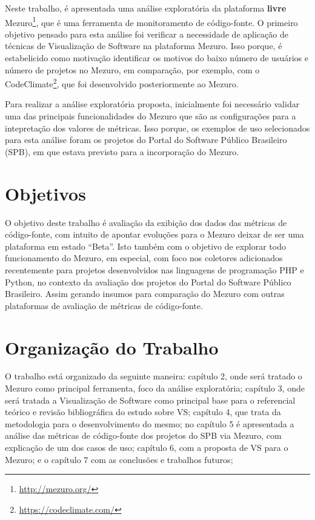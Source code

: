Neste trabalho, é apresentada uma análise exploratória da plataforma \textbf{livre}
Mezuro\footnote{\url{http://mezuro.org/}}, que é uma ferramenta de monitoramento
de código-fonte. O primeiro objetivo pensado para esta análise foi verificar a
necessidade de aplicação de técnicas de Visualização de Software na plataforma
Mezuro. Isso porque, é estabelicido como motivação identificar os motivos do
baixo número de usuários e número de projetos no Mezuro, em comparação, por
exemplo, com o CodeClimate\footnote{\url{https://codeclimate.com/}}, que foi
desenvolvido posteriormente ao Mezuro.

Para realizar a análise exploratória proposta, inicialmente foi necessário
validar uma das principais funcionalidades do Mezuro que são as configurações
para a intepretação dos valores de métricas. Isso porque, os exemplos de uso
selecionados para esta análise foram os projetos do Portal do Software
Público Brasileiro (SPB), em que estava previsto para a incorporação do Mezuro.

\section{Objetivos}

O objetivo deste trabalho é avaliação da exibição dos dados das métricas de
código-fonte, com intuito de apontar evoluções para o Mezuro deixar de ser uma
plataforma em estado ``Beta''.
%
Isto também com o objetivo de explorar todo funcionamento do Mezuro, em especial,
com foco nos coletores adicionados recentemente para projetos desenvolvidos nas
linguagens de programação PHP e Python, no contexto da avaliação dos projetos do
Portal do Software Público Brasileiro.
%
Assim gerando insumos para comparação do Mezuro com outras plataformas de
avaliação de métricas de código-fonte.

\section{Organização do Trabalho}

O trabalho está organizado da seguinte maneira: capítulo 2, onde será tratado o
Mezuro como principal ferramenta, foco da análise exploratória; capítulo 3, onde
será tratada a Visualização de Software como principal base para o
referencial teórico e revisão bibliográfica do estudo sobre VS; capítulo 4,
que trata da metodologia para o desenvolvimento do mesmo; no capítulo 5 é
apresentada a análise das métricas de código-fonte dos projetos do SPB via
Mezuro, com explicação de um dos casos de uso; capítulo 6, com a proposta de VS
para o Mezuro; e o capítulo 7 com as conclusões e trabalhos futuros;

